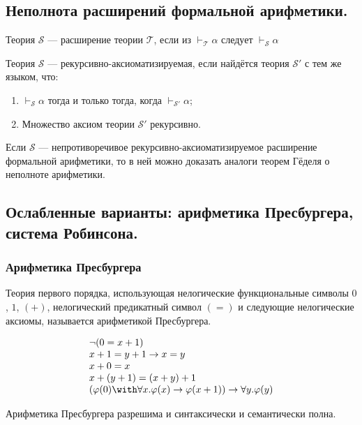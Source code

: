 \documentclass[10pt,a4paper,oneside]{article}
\begin{document}
\subsection{Неполнота расширений формальной арифметики.}

 Теория $\mathcal{S}$ --- расширение теории $\mathcal{T}$, если
из $\vdash_\mathcal{T} \alpha$ следует $\vdash_\mathcal{S} \alpha$


 Теория $\mathcal{S}$ --- рекурсивно-аксиоматизируемая, если найдётся теория $\mathcal{S'}$ с тем же языком, что:
\begin{enumerate}
\item $\vdash_\mathcal{S} \alpha$ тогда и только тогда, когда $\vdash_\mathcal{S'} \alpha$;
\item Множество аксиом теории $\mathcal{S'}$ рекурсивно.
\end{enumerate}

 Если $\mathcal{S}$ --- непротиворечивое рекурсивно-аксиоматизируемое расширение формальной арифметики, то
в ней можно доказать аналоги теорем Гёделя о неполноте арифметики.

\subsection{Ослабленные варианты: арифметика Пресбургера, система Робинсона.}

\subsubsection{Арифметика Пресбургера}
 Теория первого порядка, использующая нелогические функциональные символы $0$, $1$, $(+)$, нелогический
предикатный символ $(=)$ и следующие нелогические аксиомы, называется арифметикой Пресбургера.

$$\begin{array}{l}
\neg (0 = x + 1) \\
x + 1 = y + 1 \rightarrow x = y\\
x + 0 = x \\
x + (y + 1) = (x + y) + 1\\
(\varphi(0) \with \forall x.\varphi(x) \rightarrow \varphi(x+1)) \rightarrow \forall y.\varphi(y)
\end{array}$$

 Арифметика Пресбургера разрешима и синтаксически и семантически полна.
\end{document}
